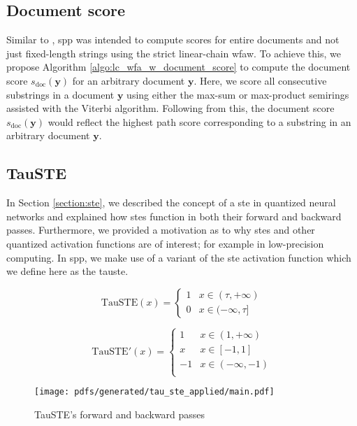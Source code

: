 \subsection{Document score}

Similar to \citet{schwartz2018sopa}, \ac{spp} was intended to compute scores for
entire documents and not just fixed-length strings using the strict linear-chain
\ac{wfaw}. To achieve this, we propose Algorithm
\ref{algo:lc_wfa_w_document_score} to compute the document score
$s_{\text{doc}}(\bm{y})$ for an arbitrary document $\bm{y}$. Here, we score all
consecutive substrings in a document $\bm{y}$ using either the max-sum or
max-product semirings assisted with the Viterbi algorithm. Following from this,
the document score $s_{\text{doc}}(\bm{y})$ would reflect the highest path score
corresponding to a substring in an arbitrary document $\bm{y}$.

\subsection{TauSTE}

In Section \ref{section:ste}, we described the concept of a \ac{ste} in
quantized neural networks and explained how \ac{ste}s function in both their
forward and backward passes. Furthermore, we provided a motivation as to why
\ac{ste}s and other quantized activation functions are of interest; for example
in low-precision computing. In \ac{spp}, we make use of a variant of the
\ac{ste} activation function which we define here as the \ac{tauste}.

\begin{equation}
  \label{eq:tau_ste_forward}
  \text{TauSTE}(x)=
  \begin{cases}
    1 & x \in (\tau, +\infty) \\
    0 & x \in (-\infty, \tau]
  \end{cases}
\end{equation}

\begin{equation}
  \label{eq:tau_ste_backward}
  \text{TauSTE}'(x)=
  \begin{cases}
    1 & x \in  (1, +\infty) \\
    x & x \in [-1, 1] \\
    -1 & x \in (-\infty, -1) \\
  \end{cases}
\end{equation}

\begin{figure}[t!]
  \centering
  \texttt{[image: pdfs/generated/tau\_ste\_applied/main.pdf]}
  \caption{TauSTE's forward and backward passes}
  \label{fig:tau_ste}
\end{figure}

